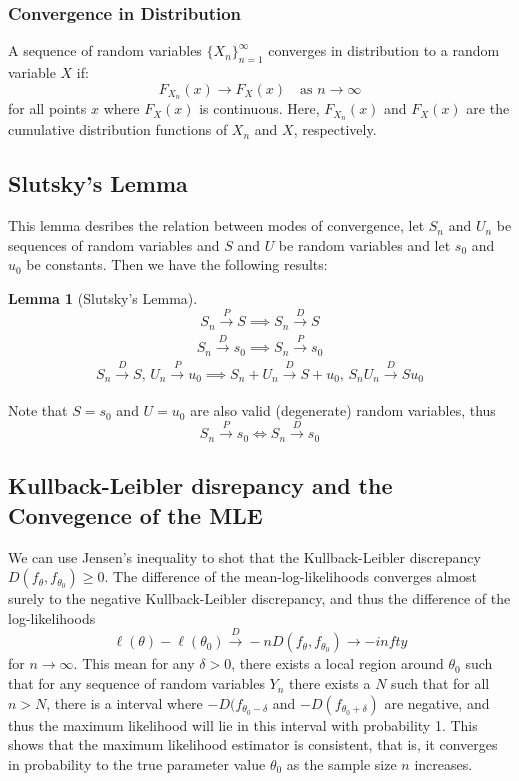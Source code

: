 \documentclass{article}
\newtheorem{lemma}[theorem]{Lemma}
\theoremstyle{definition}
\theoremstyle{remark}
\begin{document}
\subsubsection{Convergence in Distribution}
A sequence of random variables $\{X_n\}_{n=1}^{\infty}$ converges in distribution to a random variable $X$ if:
\begin{equation}
    F_{X_n}(x) \to F_X(x) \quad \text{as } n \to \infty
\end{equation}
for all points $x$ where $F_X(x)$ is continuous. Here, $F_{X_n}(x)$ and $F_X(x)$ are the cumulative distribution functions of $X_n$ and $X$, respectively.

\subsection{Slutsky's Lemma}
This lemma desribes the relation between modes of convergence, let $S_n$ and $U_n$ be sequences of random variables and $S$ and $U$ be random variables and let $s_0$ and $u_0$ be constants. Then we have the following results:
\begin{lemma}[Slutsky's Lemma]
    \begin{equation}
        S_n \xrightarrow[]{P} S \implies S_n \xrightarrow{D} S
    \end{equation}
    \begin{equation}
        S_n \xrightarrow[]{D} s_0 \implies S_n \xrightarrow{P} s_0
    \end{equation}
    \begin{equation}
        S_n \xrightarrow[]{D} S,\, U_n \xrightarrow[]{P} u_0 \implies S_n + U_n \xrightarrow{D} S + u_0, \,S_n U_n \xrightarrow{D} S u_0
    \end{equation}
    \end{lemma}
Note that $S= s_0$ and $U = u_0$ are also valid (degenerate) random variables, thus
$$S_n \xrightarrow{P} s_0 \iff S_n \xrightarrow{D} s_0$$

\subsection{Kullback-Leibler disrepancy and the Convegence of the MLE}

We can use Jensen's inequality to shot that the Kullback-Leibler discrepancy $D(f_\theta, f_{\theta_0}) \geq 0$. The difference of the mean-log-likelihoods converges almost surely to the negative Kullback-Leibler discrepancy, and thus the difference of the log-likelihoods
$$\ell(\theta) - \ell(\theta_0) \xrightarrow[]{D} -nD(f_\theta, f_{\theta_0}) \to -infty$$ for $n \to \infty$.
This mean for any $\delta >0$, there exists a local region around $\theta_0$ such that for any sequence of random variables $Y_n$ there exists a $N$ such that for all $n > N$, there is a interval where $-D(f_{\theta_0-\delta}$ and $-D(f_{\theta_0+\delta})$ are negative, and thus the maximum likelihood will lie in this interval with probability 1. This shows that the maximum likelihood estimator is consistent, that is, it converges in probability to the true parameter value $\theta_0$ as the sample size $n$ increases.
\end{document}
